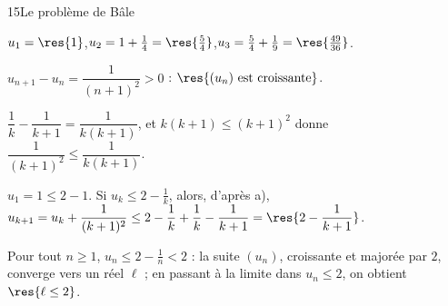 \begin{corrige}{15}{Le problème de Bâle}
\begin{questions}
  \item $u_1=\res{1}$,\quad $u_2=1+\frac14=\res{\frac54}$,\quad $u_3=\frac54+\frac19=\res{\frac{49}{36}}$.
  \item $u_{n+1}-u_n=\dfrac{1}{(n+1)^{2}}>0$ : $\res{(u_n)\text{ est croissante}}$.
  \item \begin{questions}
      \item $\dfrac{1}{k}-\dfrac{1}{k+1}=\dfrac{1}{k(k+1)}$, et $k(k+1)\leq(k+1)^{2}$ donne $\dfrac{1}{(k+1)^{2}}\leq\dfrac{1}{k(k+1)}$.
      \item {} $u_1=1\leq2-1$.\enspace
         Si $u_k\leq2-\frac1k$, alors, d'après a),
        $u_{k+1}=u_k+\dfrac{1}{(k+1)^{2}}\leq2-\dfrac1k+\dfrac1k-\dfrac{1}{k+1}=\res{2-\dfrac{1}{k+1}}$.
    \end{questions}
  \item Pour tout $n\geq1$, $u_n\leq2-\frac1n<2$ : la suite $(u_n)$, croissante et majorée par $2$, converge
    vers un réel $\ell$ ; en passant à la limite dans $u_n\leq2$, on obtient $\res{\ell\leq2}$.
\end{questions}


\end{corrige}
